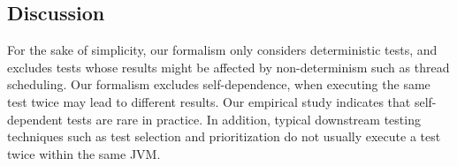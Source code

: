 \subsection{Discussion}
\label{sec:formaldiscussion}

For the sake of simplicity, our formalism only
considers deterministic tests,
and excludes tests whose results might be affected by
non-determinism such as thread scheduling.
Our formalism excludes self-dependence, 
when executing the same test twice
may lead to different results. Our empirical study
indicates that self-dependent tests
are rare in practice. In addition, typical
downstream testing techniques such as test selection and
prioritization do not usually execute a test twice within the same JVM.



